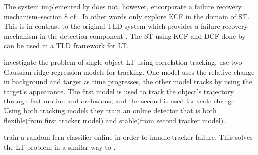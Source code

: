 The system implemented by \citeauthor{Enriques2014} does not, however, encorporate a failure recovery mechanism--section 8 of \cite{Enriques2014}.
In other words \citeauthor{Enriques2014} only explore KCF in the domain of ST.
This is in contrast to the original TLD system which provides a failure recovery mechanism in the detection component \cite{Kalal2011}.
The ST using KCF and DCF done by \citeauthor{Enriques2014} can be used in a TLD framework for LT.

\citeauthor{Ma2015Correlation} \cite{Ma2015Correlation} investigate the problem of single object LT using correlation tracking.
\citeauthor{Ma2015Correlation} use two Gaussian ridge regression \cite{murphy2012} models for tracking.
One model uses the relative change in background and target as time progresses, the other model tracks by using the target's appearance.
The first model is used to track the object's trajectory through fast motion and occlusions, and the second is used for scale change.
Using both tracking models they train an online detector that is both flexible(from first tracker model) and stable(from second tracker model).

\citeauthor{Ma2015Correlation} train a random fern classifier \cite{ferns2007, Kalal2011} online in order to handle tracker failure.
This solves the LT problem in a similar way to \citeauthor{KalalPHD} \cite{KalalPHD}.
